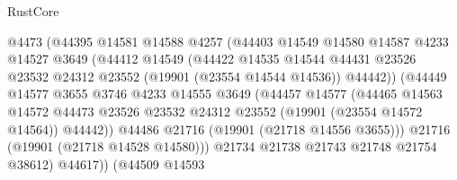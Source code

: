 \begin{lexlean}{RustCore}
\begin{coremodule}
                                @4473
                                (@44395
                                  @14581
                                  @14588
                                  @4257
                                  (@44403
                                    @14549
                                    @14580
                                    @14587
                                    @4233
                                    @14527
                                    @3649
                                    (@44412
                                      @14549
                                      (@44422
                                        @14535
                                        @14544
                                        @44431
                                        @23526
                                        @23532
                                        @24312
                                        @23552
                                        (@19901 (@23554 @14544 @14536))
                                        @44442))
                                    (@44449
                                      @14577
                                      @3655
                                      @3746
                                      @4233
                                      @14555
                                      @3649
                                      (@44457
                                        @14577
                                        (@44465
                                          @14563
                                          @14572
                                          @44473
                                          @23526
                                          @23532
                                          @24312
                                          @23552
                                          (@19901 (@23554 @14572 @14564))
                                          @44442))
                                      @44486
                                      @21716
                                      (@19901 (@21718 @14556 @3655)))
                                    @21716
                                    (@19901 (@21718 @14528 @14580)))
                                  @21734
                                  @21738
                                  @21743
                                  @21748
                                  @21754
                                  @38612)
                                @44617))
                            (@44509
                              @14593

\end{coremodule}
\end{lexlean}
